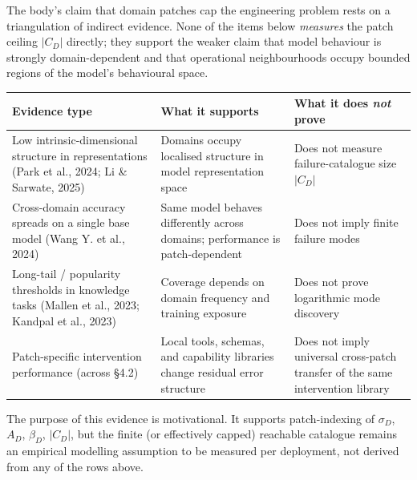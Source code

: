 \documentclass[
]{article}
\newcounter{none} %
\begin{document}
The body's claim that domain patches cap the engineering problem rests
on a triangulation of indirect evidence. None of the items below
\emph{measures} the patch ceiling \(|C_D|\) directly; they support the
weaker claim that model behaviour is strongly domain-dependent and that
operational neighbourhoods occupy bounded regions of the model's
behavioural space.

{\def\LTcaptype{none} %
\begin{longtable}[]{@{}
  >{\raggedright\arraybackslash}p{}
  >{\raggedright\arraybackslash}p{}
  >{\raggedright\arraybackslash}p{}@{}}
\toprule\noalign{}
\begin{minipage}[b]{\linewidth}\raggedright
Evidence type
\end{minipage} & \begin{minipage}[b]{\linewidth}\raggedright
What it supports
\end{minipage} & \begin{minipage}[b]{\linewidth}\raggedright
What it does \emph{not} prove
\end{minipage} \\
\midrule\noalign{}
\endhead
\bottomrule\noalign{}
\endlastfoot
Low intrinsic-dimensional structure in representations (Park et al.,
2024; Li \& Sarwate, 2025) & Domains occupy localised structure in model
representation space & Does not measure failure-catalogue size
\(\lvert C_D \rvert\) \\
Cross-domain accuracy spreads on a single base model (Wang Y. et al.,
2024) & Same model behaves differently across domains; performance is
patch-dependent & Does not imply finite failure modes \\
Long-tail / popularity thresholds in knowledge tasks (Mallen et al.,
2023; Kandpal et al., 2023) & Coverage depends on domain frequency and
training exposure & Does not prove logarithmic mode discovery \\
Patch-specific intervention performance (across §4.2) & Local tools,
schemas, and capability libraries change residual error structure & Does
not imply universal cross-patch transfer of the same intervention
library \\
\end{longtable}
}

The purpose of this evidence is motivational. It supports patch-indexing
of \(\sigma_D\), \(A_D\), \(\beta_D\), \(|C_D|\), but the finite (or
effectively capped) reachable catalogue remains an empirical modelling
assumption to be measured per deployment, not derived from any of the
rows above.
\end{document}
